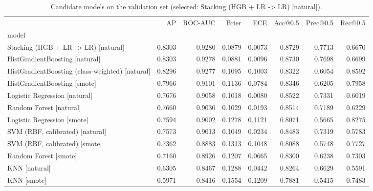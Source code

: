 \begin{table}
\caption{Candidate models on the validation set (selected: Stacking (HGB + LR -> LR) [natural]).}
\label{tab:models}
\begin{tabular}{lrrrrrrr}
\toprule
 & AP & ROC-AUC & Brier & ECE & Acc@0.5 & Prec@0.5 & Rec@0.5 \\
model &  &  &  &  &  &  &  \\
\midrule
Stacking (HGB + LR -> LR) [natural] & 0.8303 & 0.9280 & 0.0879 & 0.0073 & 0.8729 & 0.7713 & 0.6670 \\
HistGradientBoosting [natural] & 0.8303 & 0.9278 & 0.0881 & 0.0096 & 0.8730 & 0.7698 & 0.6699 \\
HistGradientBoosting (class-weighted) [natural] & 0.8296 & 0.9277 & 0.1095 & 0.1003 & 0.8322 & 0.6054 & 0.8592 \\
HistGradientBoosting [smote] & 0.7966 & 0.9101 & 0.1136 & 0.0784 & 0.8346 & 0.6205 & 0.7958 \\
Logistic Regression [natural] & 0.7676 & 0.9058 & 0.1018 & 0.0080 & 0.8522 & 0.7331 & 0.6019 \\
Random Forest [natural] & 0.7660 & 0.9030 & 0.1029 & 0.0193 & 0.8514 & 0.7189 & 0.6229 \\
Logistic Regression [smote] & 0.7594 & 0.9002 & 0.1278 & 0.1121 & 0.8071 & 0.5665 & 0.8275 \\
SVM (RBF, calibrated) [natural] & 0.7573 & 0.9013 & 0.1049 & 0.0234 & 0.8483 & 0.7319 & 0.5783 \\
SVM (RBF, calibrated) [smote] & 0.7362 & 0.8883 & 0.1313 & 0.1048 & 0.8088 & 0.5748 & 0.7727 \\
Random Forest [smote] & 0.7160 & 0.8926 & 0.1207 & 0.0665 & 0.8300 & 0.6238 & 0.7303 \\
KNN [natural] & 0.6305 & 0.8467 & 0.1288 & 0.0442 & 0.8264 & 0.6629 & 0.5591 \\
KNN [smote] & 0.5971 & 0.8416 & 0.1554 & 0.1209 & 0.7881 & 0.5415 & 0.7483 \\
\bottomrule
\end{tabular}
\end{table}
